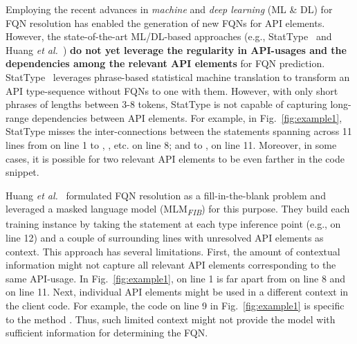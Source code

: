 Employing the recent advances in {\em machine} and {\em deep learning} (ML \& DL) for FQN resolution has enabled the generation of new FQNs for API elements. However, the state-of-the-art ML/DL-based approaches (e.g., StatType~\cite{icse18} and Huang {\em et al.}~\cite{prompt-ase22}) {\bf do not yet leverage the regularity in API-usages and the dependencies among the relevant API elements} for FQN prediction. StatType~\cite{icse18} leverages phrase-based statistical machine translation to transform an API type-sequence without FQNs to one with them. However, with only short phrases of lengths between 3-8 tokens, StatType is not capable of capturing long-range dependencies between API elements. For example, in Fig.~\ref{fig:example1}, StatType misses the inter-connections between the statements spanning across 11 lines from  on line 1 to , , etc. on line 8; and to ,  on line 11. Moreover, in some cases, it is possible for two relevant API elements to be even farther in the code snippet.

Huang {\em et al.}~\cite{prompt-ase22} formulated FQN resolution as a fill-in-the-blank problem and leveraged a masked language model (MLM\textsubscript{\textit{FIB}}) for this purpose. They build each training instance by taking the statement at each type inference point (e.g.,  on line 12) and a couple of surrounding lines with unresolved API elements as context. This approach has several limitations. First, the amount of contextual information might not capture all relevant API elements corresponding to the same API-usage. In Fig.~\ref{fig:example1},  on line 1 is far apart from  on line 8 and  on line 11. Next, individual API elements might be used in a different context in the client code. For example, the code on line 9 in Fig.~\ref{fig:example1} is specific to the method . Thus, such limited context might not provide the model with sufficient information for determining the FQN.



